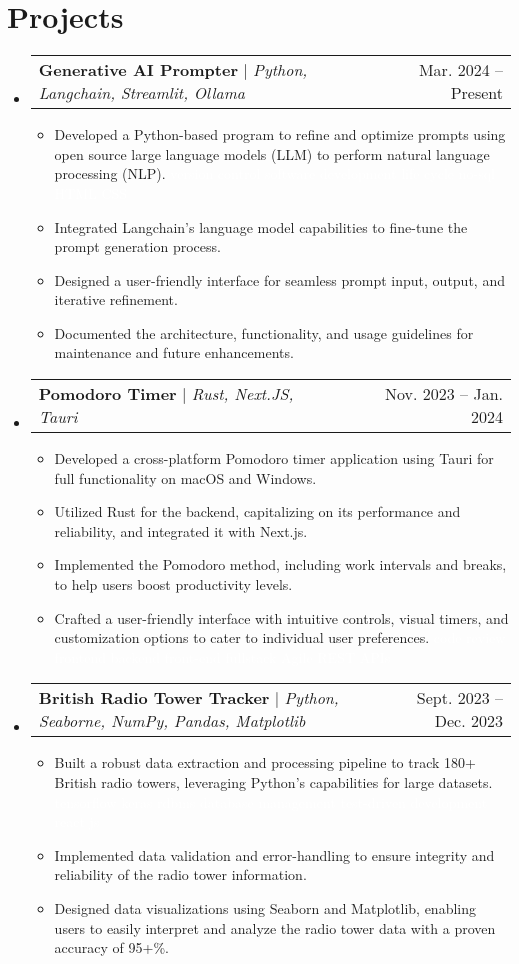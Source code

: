 \documentclass[letterpaper,11pt]{article}
\makeatletter
\newcommand{\resumeItem}[1]{
  \item\small{
    {#1 \vspace{-2pt}}
  }
}
\newcommand{\resumeProjectHeading}[2]{
    \item
    \begin{tabular*}{0.97\textwidth}{l@{\extracolsep{\fill}}r}
      \small#1 & #2 \\
    \end{tabular*}\vspace{-7pt}
}
\newcommand{\resumeSubHeadingListStart}{\begin{itemize}[leftmargin=0.15in, label={}]}
\newcommand{\resumeSubHeadingListEnd}{\end{itemize}}
\newcommand{\resumeItemListStart}{\begin{itemize}}
\newcommand{\resumeItemListEnd}{\end{itemize}\vspace{-5pt}}
\makeatother
\begin{document}
\section{Projects}
    \resumeSubHeadingListStart
      \resumeProjectHeading
          {\textbf{Generative AI Prompter} $|$ \emph{Python, Langchain, Streamlit, Ollama}}{Mar. 2024 -- Present}
          \resumeItemListStart
            \resumeItem{Developed a Python-based program to refine and optimize prompts using open source large language models (LLM) to perform natural language processing (NLP).
            \small{
            \textcolor{white}{
              version control software development life cycle  no-sql HTML CSS}
              }}
            \resumeItem{Integrated Langchain's language model capabilities to fine-tune the prompt generation process.}
            \resumeItem{Designed a user-friendly interface for seamless prompt input, output, and iterative refinement.}
            \resumeItem{Documented the architecture, functionality, and usage guidelines for maintenance and future enhancements.}
          \resumeItemListEnd
      \resumeProjectHeading
          {\textbf{Pomodoro Timer} $|$ \emph{Rust, Next.JS, Tauri}}{Nov. 2023 -- Jan. 2024}
          \resumeItemListStart
            \resumeItem{Developed a cross-platform Pomodoro timer application using Tauri for full functionality on macOS and Windows.}
            \resumeItem{Utilized Rust for the backend, capitalizing on its performance and reliability, and integrated it with Next.js.}
            \resumeItem{Implemented the Pomodoro method, including work intervals and breaks, to help users boost productivity levels.}
            \resumeItem{Crafted a user-friendly interface with intuitive controls, visual timers, and customization options to cater to individual user preferences.
            \small{
            \textcolor{white}{
              code review frontend backend front-end fullstack Agile REST APIs}
            }}
         
          \resumeItemListEnd
          \resumeProjectHeading
          {\textbf{British Radio Tower Tracker} $|$ \emph{Python, Seaborne, NumPy, Pandas, Matplotlib}}{Sept. 2023 -- Dec. 2023}
          \resumeItemListStart
          \resumeItem{Built a robust data extraction and processing pipeline to track 180+ British radio towers, leveraging Python's capabilities for large datasets.
          \small{
            \textcolor{white}{
          tensorflow keras rdbms database management test-driven development react js
          }
          }}
          \resumeItem{Implemented data validation and error-handling to ensure integrity and reliability of the radio tower information.}
          \resumeItem{Designed data visualizations using Seaborn and Matplotlib, enabling users to easily interpret and analyze the radio tower data with a proven accuracy of 95+\%.}
          \resumeItemListEnd
          \resumeSubHeadingListEnd
          
\end{document}
